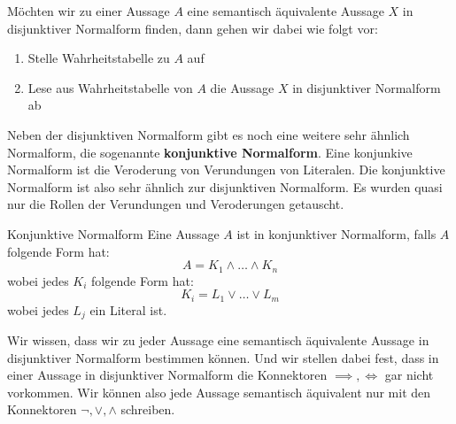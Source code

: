\documentclass[../../main.tex]{subfiles}
\begin{document}
    Möchten wir zu einer Aussage $A$ eine semantisch äquivalente Aussage $X$ in disjunktiver Normalform
    finden, dann gehen wir dabei wie folgt vor:
    \begin{enumerate}
        \item Stelle Wahrheitstabelle zu $A$ auf
        \item Lese aus Wahrheitstabelle von $A$ die Aussage $X$ in disjunktiver Normalform ab
    \end{enumerate}

    Neben der disjunktiven Normalform gibt es noch eine 
    weitere sehr ähnlich Normalform, die sogenannte \textbf{konjunktive Normalform}.
    Eine konjunkive Normalform ist die Veroderung von Verundungen von Literalen. 
    Die konjunktive Normalform ist also sehr ähnlich zur disjunktiven Normalform. Es 
    wurden quasi nur die Rollen der Verundungen und Veroderungen getauscht.
    
    \begin{definition}{Konjunktive Normalform}
        Eine Aussage $A$ ist in konjunktiver Normalform, falls $A$ folgende Form hat:
        \[A = K_1 \land \dots \land K_n\]
        wobei jedes $K_i$ folgende Form hat:
        \[K_i = L_1 \lor \dots \lor L_m \]
        wobei jedes $L_j$ ein Literal ist.
    \end{definition}

    Wir wissen, dass wir zu jeder Aussage eine semantisch äquivalente
    Aussage in 
    disjunktiver Normalform bestimmen können. Und wir stellen dabei fest,
    dass in einer Aussage in disjunktiver Normalform die Konnektoren 
    $\implies,\iff$ gar nicht vorkommen.
    Wir können also jede Aussage semantisch äquivalent nur mit den Konnektoren 
    $\lnot,\lor,\land$ schreiben.
\end{document}
